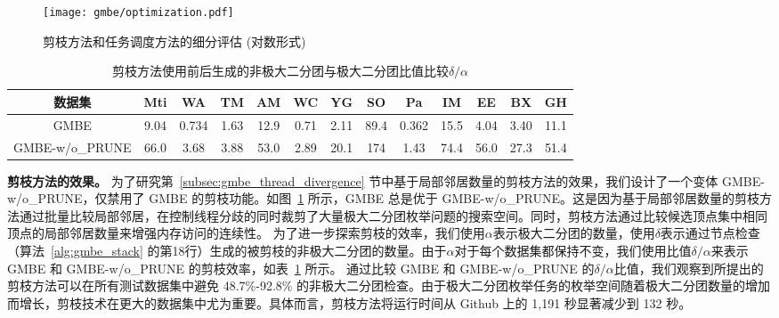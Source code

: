 \begin{figure}
	\centering
  \vspace{0.1in}
	\texttt{[image: gmbe/optimization.pdf]}	
	\vspace{0.1in}
  \caption{剪枝方法和任务调度方法的细分评估 (对数形式)}
	\label{fig:gmbe_exp_optimization}
\end{figure}

\begin{table}[H]
	\centering
	\caption{ 剪枝方法使用前后生成的非极大二分团与极大二分团比值比较$\delta/\alpha$}
	\label{tbl:gmbe_prune}
	\begin{center}
    \setlength{\tabcolsep}{4pt}
		\small
    {
			\begin{tabular}{|c|c|c|c|c|c|c|c|c|c|c|c|c|}
				\hline
        \textbf{数据集} &Mti &WA &TM &AM &WC &YG &SO &Pa &IM &EE &BX &GH \\ \hline
        GMBE &9.04 &0.734 &1.63 &12.9 &0.71 &2.11 &89.4 &0.362 &15.5 &4.04 &3.40 &11.1 \\ 
        GMBE-w/o\_PRUNE &66.0 &3.68 &3.88 &53.0 &2.89 &20.1 &174 &1.43 &74.4 &56.0 &27.3 &51.4 \\ \hline
        

      \end{tabular}
		}
	\end{center}

\end{table}

\textbf{剪枝方法的效果。} 为了研究第~\ref{subsec:gmbe_thread_divergence} 节中基于局部邻居数量的剪枝方法的效果，我们设计了一个变体 GMBE-w/o\_PRUNE，仅禁用了 GMBE 的剪枝功能。如图~\ref{fig:gmbe_exp_optimization} 所示，GMBE 总是优于 GMBE-w/o\_PRUNE。这是因为基于局部邻居数量的剪枝方法通过批量比较局部邻居，在控制线程分歧的同时裁剪了大量极大二分团枚举问题的搜索空间。同时，剪枝方法通过比较候选顶点集中相同顶点的局部邻居数量来增强内存访问的连续性。
为了进一步探索剪枝的效率，我们使用$\alpha$表示极大二分团的数量，使用$\delta$表示通过节点检查（算法~\ref{alg:gmbe_stack} 的第18行）生成的被剪枝的非极大二分团的数量。由于$\alpha$对于每个数据集都保持不变，我们使用比值$\delta/\alpha$来表示 GMBE 和 GMBE-w/o\_PRUNE 的剪枝效率，如表~\ref{tbl:gmbe_prune} 所示。
通过比较 GMBE 和 GMBE-w/o\_PRUNE 的$\delta/\alpha$比值，我们观察到所提出的剪枝方法可以在所有测试数据集中避免 48.7\%-92.8\% 的非极大二分团检查。由于极大二分团枚举任务的枚举空间随着极大二分团数量的增加而增长，剪枝技术在更大的数据集中尤为重要。具体而言，剪枝方法将运行时间从 Github 上的 1,191 秒显著减少到 132 秒。

